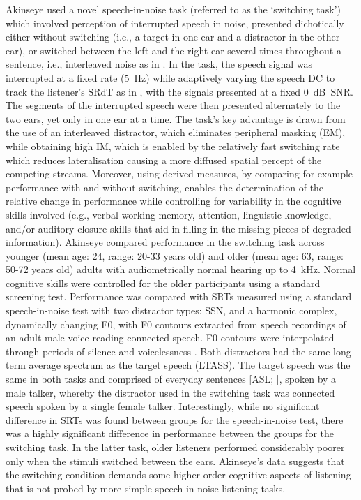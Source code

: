 \documentclass[a4paper, twoside]{templates/ociamthesis}
\begin{document}
Akinseye \autocite*[unpublished BSc thesis,][]{Akinseye2015} used a novel speech-in-noise task (referred to as the `switching task') which involved perception of interrupted speech in noise, presented dichotically either without switching (i.e., a target in one ear and a distractor in the other ear), or switched between the left and the right ear several times throughout a sentence, i.e., interleaved noise as in \textcite{Hoffman1978}. In the task, the speech signal was interrupted at a fixed rate (5~Hz) while adaptively varying the speech DC to track the listener's SRdT as in \textcite{Mair2013}, with the signals presented at a fixed 0~dB~SNR. The segments of the interrupted speech were then presented alternately to the two ears, yet only in one ear at a time. The task's key advantage is drawn from the use of an interleaved distractor, which eliminates peripheral masking (EM), while obtaining high IM, which is enabled by the relatively fast switching rate which reduces lateralisation causing a more diffused spatial percept of the competing streams. Moreover, using derived measures, by comparing for example performance with and without switching, enables the determination of the relative change in performance while controlling for variability in the cognitive skills involved (e.g., verbal working memory, attention, linguistic knowledge, and/or auditory closure skills that aid in filling in the missing pieces of degraded information). Akinseye compared performance in the switching task across younger (mean age: 24, range: 20-33 years old) and older (mean age: 63, range: 50-72 years old) adults with audiometrically normal hearing up to 4~kHz. Normal cognitive skills were controlled for the older participants using a standard screening test. Performance was compared with SRTs measured using a standard speech-in-noise test with two distractor types: SSN, and a harmonic complex, dynamically changing F0, with F0 contours extracted from speech recordings of an adult male voice reading connected speech. F0 contours were interpolated through periods of silence and voicelessness \autocite[for more details about the distractor see the Methods section or][]{Green2013}. Both distractors had the same long-term average spectrum as the target speech (LTASS). The target speech was the same in both tasks and comprised of everyday sentences {[}ASL; \textcite{MacLeod1990}{]}, spoken by a male talker, whereby the distractor used in the switching task was connected speech spoken by a single female talker. Interestingly, while no significant difference in SRTs was found between groups for the speech-in-noise test, there was a highly significant difference in performance between the groups for the switching task. In the latter task, older listeners performed considerably poorer only when the stimuli switched between the ears. Akinseye's data suggests that the switching condition demands some higher-order cognitive aspects of listening that is not probed by more simple speech-in-noise listening tasks.\\
\end{document}
